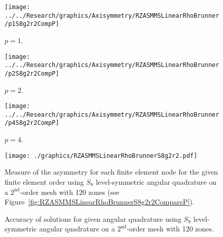 \documentclass[12pt,letterpaper]{article}
\begin{document}
\begin{sidewaysfigure}[!htb]
\centering
\begin{subfigure}{0.33\textwidth}
\texttt{[image: ../../Research/graphics/Axisymmetry/RZASMMSLinearRhoBrunner/p1S8g2r2CompP]}
\caption{$p=1$.}
\end{subfigure}%
\begin{subfigure}{0.33\textwidth}
\texttt{[image: ../../Research/graphics/Axisymmetry/RZASMMSLinearRhoBrunner/p2S8g2r2CompP]}
\caption{$p=2$.}
\end{subfigure}%
\begin{subfigure}{0.33\textwidth}
\texttt{[image: ../../Research/graphics/Axisymmetry/RZASMMSLinearRhoBrunner/p4S8g2r2CompP]}
\caption{$p=4$.}
\end{subfigure}
\caption{Relative asymmetry for $p=\{1,2,4\}$ finite elements on a $2^\text{nd}$-order mesh for $S_8$ level-symmetric angular quadrature.}
\label{fig:RZASMMSLinearRhoBrunnerS8g2r2CompareP}
\end{sidewaysfigure}

\begin{figure}[!htb]
\centering
\texttt{[image: ./graphics/RZASMMSLinearRhoBrunnerS8g2r2.pdf]}
\caption{Measure of the asymmetry for each finite element node for the given finite element order using $S_8$ level-symmetric angular quadrature on a $2^\text{nd}$-order mesh with 120 zones (see Figure~\ref{fig:RZASMMSLinearRhoBrunnerS8g2r2CompareP}).}
\label{fig:RZASMMSLinearRhoBrunnerS8g2r2Nodes}
\end{figure}

\begin{figure}[!htb]
\centering
{}
\caption{Accuracy of solutions for given angular quadrature using $S_8$ level-symmetric angular quadrature on a $2^\text{nd}$-order mesh with 120 zones.}
\label{fig:RZASMMSLinearRhoBrunnerS8g2r2Accuracy}
\end{figure}
\end{document}
